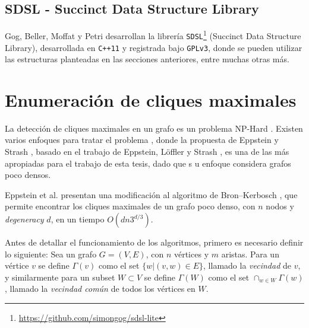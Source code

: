 \subsection{SDSL - Succinct Data Structure Library}
Gog, Beller, Moffat y Petri \cite{gbmp2014sea} desarrollan la librería \texttt{SDSL}\footnote{\url{https://github.com/simongog/sdsl-lite}} (Succinct Data Structure Library), desarrollada en \texttt{C++11} y registrada bajo \texttt{GPLv3}, donde se pueden utilizar las estructuras planteadas en las secciones anteriores, entre muchas otras más.



\section{Enumeración de cliques maximales} \label{sec:Cliques}
La detección de cliques maximales en un grafo es un problema NP-Hard \cite{karp1972reducibility}. Existen varios enfoques para tratar el problema \cite{bron1973algorithm, eblen2012maximum, hendrix2010theoretical, bomze1999maximum, eppstein2010listing, eppstein2011listing}, donde la propuesta de Eppstein y Strash \cite{eppstein2011listing}, basado en el trabajo de Eppstein, Löffler y Strash \cite{eppstein2010listing}, es una de las más apropiadas para el trabajo de esta tesis, dado que s u enfoque considera grafos poco densos.

Eppstein et al. \cite{eppstein2010listing} presentan una modificación al algoritmo de Bron–Kerbosch \cite{bron1973algorithm}, que permite encontrar los cliques maximales de un grafo poco denso, con $n$ nodos y \textit{degeneracy} $d$, en un tiempo $O(dn3^{d/3})$.

Antes de detallar el funcionamiento de los algoritmos, primero es necesario definir lo siguiente: Sea un grafo $G = (V, E)$, con $n$ vértices y $m$ aristas. Para un vértice $v$ se define $\Gamma(v)$ como el set $\{w | (v, w) \in E\}$, llamado la \textit{vecindad} de $v$, y similarmente para un subset $W \subset V$ se define $\Gamma(W)$ como el set $\cap_{w \in W} \Gamma(w)$, llamado la \textit{vecindad común} de todos los vértices en $W$.

